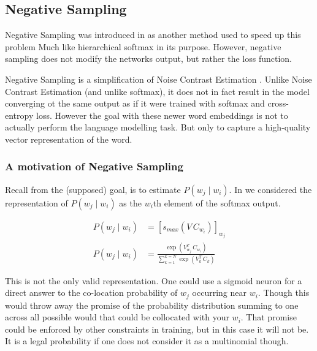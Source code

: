 \documentclass[parskip]{komatufte}
\begin{document}
\subsection{Negative Sampling}


Negative Sampling was introduced in  as another method used to speed up this problem
Much like hierarchical softmax in its purpose.
However, negative sampling does not modify the networks output,
but rather the loss function.


Negative Sampling is a simplification of Noise Contrast Estimation .
Unlike Noise Contrast Estimation (and unlike softmax), it does not in fact result in the model converging ot the same output as if it were trained with softmax and cross-entropy loss.
However the goal with these newer word embeddings is not to actually perform the language modelling task.
But only to capture a high-quality vector representation of the word.

\subsubsection{A motivation of Negative Sampling}
Recall from  the (supposed) goal, is to estimate $P(w_j\mid w_i)$.
In    we considered the representation of $P(w_j\mid w_i)$ as the $w_i$th element of the softmax output.

\begin{align}
P(w_j \mid w_{i}) & = \left[ s_{max}(V\,C_{w_{i}}) \right]_{w_j} \\
P(w_j \mid w_{i}) & = \frac{\exp(V_{w_j}^T\,C_{w_{i}})}{\sum_{k=1}^{k=N} \exp(V_k^T\,C_{k})}
\end{align}



This is not the only valid representation.
One could use a sigmoid neuron for a direct answer to the co-location probability of $w_j$ occurring near $w_i$.
Though this would throw away the promise of the probability distribution summing to one across all possible would that could be collocated with your $w_i$.
That promise could be enforced by other constraints in training, but in this case it will not be.
It is a legal probability if one does not consider it as a multinomial though.
\end{document}
